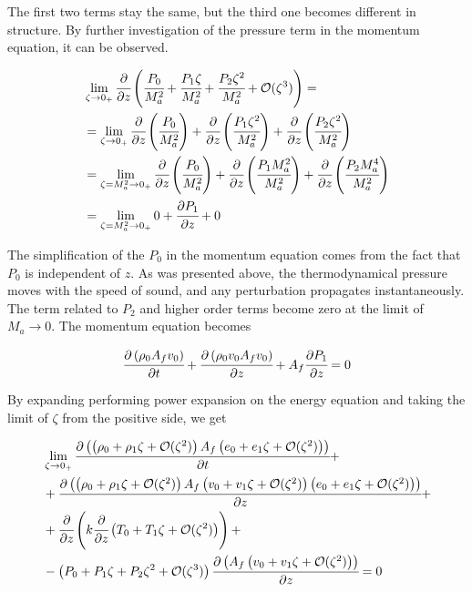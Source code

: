 \documentclass[../Article_Model_Parameters.tex]{subfiles}
\begin{document}
	The first two terms stay the same, but the third one becomes different in structure. By further investigation of the pressure term in the momentum equation, it can be observed.
	
	{\footnotesize
		\begin{align*}
			& \lim_{\zeta \rightarrow 0_+} \cfrac{\partial }{\partial z} \left(  \cfrac{P_0}{M_a^2}	+ \cfrac{P_1 \zeta}{M_a^2}	+ \cfrac{P_2 \zeta^2}{M_a^2} + \mathcal{O}(\zeta^3) \right) = \\
			& = \lim_{\zeta \rightarrow 0_+} \cfrac{\partial }{\partial z} \left(  \cfrac{P_0}{M_a^2} \right) + \cfrac{\partial }{\partial z} \left(  \cfrac{P_1 \zeta^2}{M_a^2} \right) + \cfrac{\partial }{\partial z} \left(  \cfrac{P_2 \zeta^2}{M_a^2} \right) \\
			& = \lim_{\zeta=M_a^2 \rightarrow 0_+} \cfrac{\partial }{\partial z} \left(  \cfrac{P_0}{M_a^2} \right) + \cfrac{\partial }{\partial z} \left(  \cfrac{P_1 M_a^2}{M_a^2} \right) + \cfrac{\partial }{\partial z} \left(  \cfrac{P_2 M_a^4}{M_a^2} \right) \\
			& = \lim_{\zeta=M_a^2 \rightarrow 0_+} 0 + \cfrac{\partial P_1}{\partial z}  + 0 \\
		\end{align*}
	}
	
	The simplification of the $P_0$ in the momentum equation comes from the fact that $P_0$ is independent of $z$. As was presented above, the thermodynamical pressure moves with the speed of sound, and any perturbation propagates instantaneously. The term related to $P_2$ and higher order terms become zero at the limit of $M_a \rightarrow 0$. The momentum equation becomes
	
	{\footnotesize
		\begin{equation*}
			\cfrac{\partial \left( \rho_0 A_f v_0 \right) }{\partial t}	+ \cfrac{\partial \left( \rho_0 v_0 A_f v_0 \right)}{\partial z} + A_f \cfrac{\partial P_1}{\partial z} = 0
		\end{equation*}
	}
	
	By expanding performing power expansion on the energy equation and taking the limit of $\zeta$ from the positive side, we get
	
	{\footnotesize
		\begin{align*}
			& \lim_{\zeta \rightarrow 0_+} \cfrac{\partial \left( \left( \rho_0	+ \rho_1 \zeta	+ \mathcal{O}(\zeta^2) \right) A_f \left( e_0	+ e_1 \zeta 	+ \mathcal{O}(\zeta^2) \right) \right)}{\partial t} + \\
			&+ \cfrac{\partial \left(  \left(  \rho_0	+ \rho_1 \zeta	+ \mathcal{O}(\zeta^2) \right) A_f \left( v_0	+ v_1 \zeta 	+ \mathcal{O}(\zeta^2) \right) \left( e_0	+ e_1 \zeta 	+ \mathcal{O}(\zeta^2) \right) \right) }{\partial z} + \\
			&+ \cfrac{\partial}{\partial z} \left( k \cfrac{\partial }{\partial z} \left( T_0 	+ T_1 \zeta 	+ \mathcal{O}(\zeta^2) \right) \right) + \\
			&- \left(  P_0 	+ P_1 \zeta		+ P_2 \zeta^2 		+ \mathcal{O}(\zeta^3)  \right) \cfrac{\partial \left( A_f \left( v_0 + v_1 \zeta + \mathcal{O}(\zeta^2) \right) \right) }{\partial z} = 0
		\end{align*}
	}
	
\end{document}
